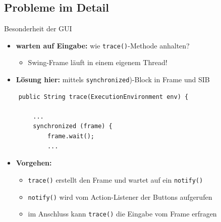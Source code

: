 \subsection*{Probleme im Detail}
\begin{frame}[fragile]{Besonderheit der GUI}
\begin{itemize}[<+->]
	\item \textbf{warten auf Eingabe:} wie \texttt{trace()}-Methode anhalten? 
		\begin{itemize}[<+->]
			\item Swing-Frame läuft in einem eigenem Thread!
		\end{itemize}
	\pause		
	\item \textbf{Lösung hier:} mittels \texttt{synchronized})-Block in Frame und SIB
\end{itemize}
		
	\begin{lstlisting}
	public String trace(ExecutionEnvironment env) {

		...
		synchronized (frame) {
			frame.wait();
			...
	\end{lstlisting}
	
\begin{itemize}[<+->]	
	\item \textbf{Vorgehen:} 
		\begin{itemize}[<+->]
			\item \texttt{trace()} erstellt den Frame und wartet auf ein \texttt{notify()}
			\item \texttt{notify()} wird vom Action-Listener der Buttons aufgerufen
			\item im Anschluss kann \texttt{trace()} die Eingabe vom Frame erfragen
		\end{itemize}
\end{itemize}
\end{frame}


